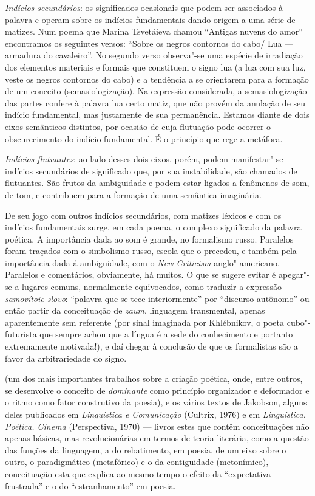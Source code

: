 {  \emph{Indícios secundários}: os significados ocasionais que podem ser
  associados à palavra e operam sobre os indícios fundamentais dando
  origem a uma série de matizes. Num poema que Marina Tsvetáieva chamou
  ``Antigas nuvens do amor'' encontramos os seguintes versos: ``Sobre os
  negros contornos do cabo/ Lua --- armadura do cavaleiro''. No segundo
  verso observa"-se uma espécie de irradiação dos elementos materiais e
  formais que constituem o signo lua (a lua com sua luz, veste os negros
  contornos do cabo) e a tendência a se orientarem para
  a formação de um conceito (semasiologização). Na expressão considerada,
  a semasiologização das partes confere à palavra lua certo matiz, que
  não provém da anulação de seu indício fundamental, mas justamente de
  sua permanência. Estamos diante de dois eixos semânticos distintos,
  por ocasião de cuja flutuação pode ocorrer o obscurecimento do indício
  fundamental. É o princípio que rege a metáfora.

  \emph{Indícios flutuantes}: ao lado desses dois eixos, porém, podem
  manifestar"-se indícios secundários de significado que, por sua
  instabilidade, são chamados de flutuantes. São frutos da ambiguidade e
  podem estar ligados a fenômenos de som, de tom, e contribuem para a
  formação de uma semântica imaginária.

  De seu jogo com outros indícios secundários, com matizes léxicos e com
  os indícios fundamentais surge, em cada poema, o complexo significado
  da palavra poética. A importância dada ao som é grande, no formalismo
  russo. Paralelos foram traçados com o simbolismo russo, escola que o
  precedeu, e também pela importância dada á ambiguidade, com o
  \emph{New Criticism} anglo"-americano. Paralelos e comentários,
  obviamente, há muitos. O que se sugere evitar é apegar"-se a lugares
  comuns, normalmente equivocados, como traduzir a expressão
  \emph{samovítoie slovo}: ``palavra que se tece interiormente'' por
  ``discurso autônomo'' ou então partir da conceituação de \emph{zaum},
  linguagem transmental, apenas aparentemente sem referente (por sinal
  imaginada por Khlébnikov, o poeta cubo"-futurista que sempre achou que a
  língua é a sede do conhecimento e portanto extremamente motivada!), e
  daí chegar à conclusão de que os formalistas são a favor da
  arbitrariedade do signo.} (um dos mais importantes trabalhos sobre a
criação poética, onde, entre outros, se desenvolve o conceito de
\emph{dominante} como princípio organizador e deformador e o ritmo como
fator construtivo da poesia), e os vários textos de Jakobson, alguns
deles publicados em \emph{Linguística e Comunicação} (Cultrix, 1976) e em
\emph{Linguística. Poética. Cinema} (Perspectiva, 1970) --- livros estes
que contêm conceituações
não apenas básicas, mas revolucionárias em termos de teoria literária,
como a questão das funções da linguagem, a do rebatimento, em poesia, de
um eixo sobre o outro, o paradigmático (metafórico) e o da contiguidade
(metonímico), conceituação esta que explica ao mesmo tempo o efeito da
``expectativa frustrada'' e o do ``estranhamento'' em poesia.

